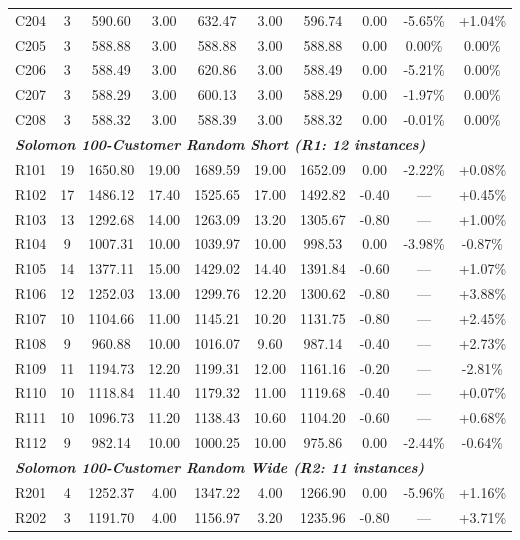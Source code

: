 \documentclass{article}
\begin{document}
\begin{table}[!htbp]
\begin{tabular*}{\textwidth}{@{\extracolsep{\fill}} l cc cc cc ccc @{}}
C204 & 3 & 590.60 & 3.00 & 632.47 & 3.00 & 596.74 & 0.00 & -5.65\% & +1.04\% \\
C205 & 3 & 588.88 & 3.00 & 588.88 & 3.00 & 588.88 & 0.00 & 0.00\% & 0.00\% \\
C206 & 3 & 588.49 & 3.00 & 620.86 & 3.00 & 588.49 & 0.00 & -5.21\% & 0.00\% \\
C207 & 3 & 588.29 & 3.00 & 600.13 & 3.00 & 588.29 & 0.00 & -1.97\% & 0.00\% \\
C208 & 3 & 588.32 & 3.00 & 588.39 & 3.00 & 588.32 & 0.00 & -0.01\% & 0.00\% \\
\midrule
\multicolumn{10}{l}{\textit{\textbf{Solomon 100-Customer Random Short (R1: 12 instances)}}} \\
R101 & 19 & 1650.80 & 19.00 & 1689.59 & 19.00 & 1652.09 & 0.00 & -2.22\% & +0.08\% \\
R102 & 17 & 1486.12 & 17.40 & 1525.65 & 17.00 & 1492.82 & -0.40 & --- & +0.45\% \\
R103 & 13 & 1292.68 & 14.00 & 1263.09 & 13.20 & 1305.67 & -0.80 & --- & +1.00\% \\
R104 & 9 & 1007.31 & 10.00 & 1039.97 & 10.00 & 998.53 & 0.00 & -3.98\% & -0.87\% \\
R105 & 14 & 1377.11 & 15.00 & 1429.02 & 14.40 & 1391.84 & -0.60 & --- & +1.07\% \\
R106 & 12 & 1252.03 & 13.00 & 1299.76 & 12.20 & 1300.62 & -0.80 & --- & +3.88\% \\
R107 & 10 & 1104.66 & 11.00 & 1145.21 & 10.20 & 1131.75 & -0.80 & --- & +2.45\% \\
R108 & 9 & 960.88 & 10.00 & 1016.07 & 9.60 & 987.14 & -0.40 & --- & +2.73\% \\
R109 & 11 & 1194.73 & 12.20 & 1199.31 & 12.00 & 1161.16 & -0.20 & --- & -2.81\% \\
R110 & 10 & 1118.84 & 11.40 & 1179.32 & 11.00 & 1119.68 & -0.40 & --- & +0.07\% \\
R111 & 10 & 1096.73 & 11.20 & 1138.43 & 10.60 & 1104.20 & -0.60 & --- & +0.68\% \\
R112 & 9 & 982.14 & 10.00 & 1000.25 & 10.00 & 975.86 & 0.00 & -2.44\% & -0.64\% \\
\midrule
\multicolumn{10}{l}{\textit{\textbf{Solomon 100-Customer Random Wide (R2: 11 instances)}}} \\
R201 & 4 & 1252.37 & 4.00 & 1347.22 & 4.00 & 1266.90 & 0.00 & -5.96\% & +1.16\% \\
R202 & 3 & 1191.70 & 4.00 & 1156.97 & 3.20 & 1235.96 & -0.80 & --- & +3.71\% \\

\end{tabular*}
\end{table}
\end{document}
